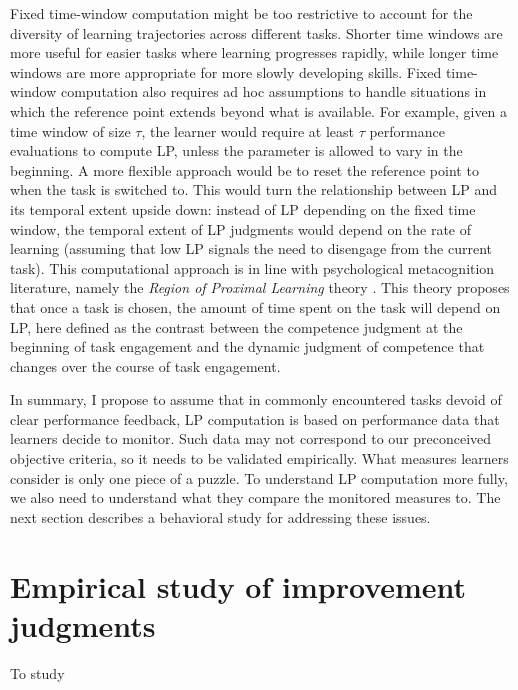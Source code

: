 Fixed time-window computation might be too restrictive to account for the diversity of learning trajectories across different tasks. Shorter time windows are more useful for easier tasks where learning progresses rapidly, while longer time windows are more appropriate for more slowly developing skills. Fixed time-window computation also requires ad hoc assumptions to handle situations in which the reference point extends beyond what is available. For example, given a time window of size $\tau$, the learner would require at least $\tau$ performance evaluations to compute \ac{LP}, unless the parameter is allowed to vary in the beginning. A more flexible approach would be to reset the reference point to when the task is switched to. This would turn the relationship between \ac{LP} and its temporal extent upside down: instead of \ac{LP} depending on the fixed time window, the temporal extent of \ac{LP} judgments would depend on the rate of learning (assuming that low \ac{LP} signals the need to disengage from the current task). This computational approach is in line with psychological metacognition literature, namely the \emph{Region of Proximal Learning} theory \cite{metcalfe_region_2005}. This theory proposes that once a task is chosen, the amount of time spent on the task will depend on \ac{LP}, here defined as the contrast between the competence judgment at the beginning of task engagement and the dynamic judgment of competence that changes over the course of task engagement.

In summary, I propose to assume that in commonly encountered tasks devoid of clear performance feedback, \ac{LP} computation is based on performance data that learners decide to monitor. Such data may not correspond to our preconceived objective criteria, so it needs to be validated empirically. What measures learners consider is only one piece of a puzzle. To understand \ac{LP} computation more fully, we also need to understand what they compare the monitored measures to. The next section describes a behavioral study for addressing these issues.

\section{Empirical study of improvement judgments}
To study 


